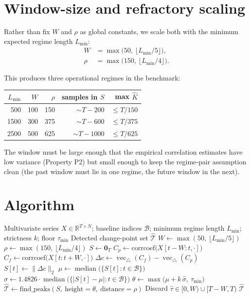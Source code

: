 \documentclass[11pt,a4paper]{article}
\newcommand{\med}{\operatorname{median}}
\newcommand{\vectri}{\operatorname{vec}_{\triangle}}
\newcommand{\R}{\mathbb{R}}
\begin{document}
\section{Window-size and refractory scaling}

Rather than fix $W$ and $\rho$ as global constants, we scale both with the
minimum expected regime length $L_{\min}$:
\begin{align}
W   &= \max\!\big(50,\ \lfloor L_{\min}/5 \rfloor\big), \\
\rho &= \max\!\big(150,\ \lfloor L_{\min}/4 \rfloor\big).
\end{align}

This produces three operational regimes in the benchmark:
\begin{center}
\begin{tabular}{rrrrr}
\toprule
$L_{\min}$ & $W$ & $\rho$ & samples in $S$ & max $\hat K$ \\
\midrule
500   & 100 & 150  & $\sim T - 200$  & $\le T / 150$ \\
1500  & 300 & 375  & $\sim T - 600$  & $\le T / 375$ \\
2500  & 500 & 625  & $\sim T - 1000$ & $\le T / 625$ \\
\bottomrule
\end{tabular}
\end{center}

The window must be large enough that the empirical correlation estimates
have low variance (Property P2) but small enough to keep the regime-pair
assumption clean (the past window must lie in one regime, the future
window in the next).

\section{Algorithm}

\begin{algorithm}[H]
\caption{v1-H: correlation-based change-point detection}
\label{alg:v1h}
\begin{algorithmic}[1]
\Require Multivariate series $X \in \R^{T \times N}$; baseline indices
         $\mathcal{B}$; minimum regime length $L_{\min}$; strictness $k$;
         floor $\tau_{\min}$
\Ensure  Detected change-point set $\widehat{\mathcal{T}}$
\Statex
\State $W \gets \max(50,\ \lfloor L_{\min}/5 \rfloor)$
\State $\rho \gets \max(150,\ \lfloor L_{\min}/4 \rfloor)$
\State $S \gets \mathbf{0}_T$
   \State $C_p \gets \mathrm{corrcoef}\big(X[t-W:t,\cdot]\big)$
   \State $C_f \gets \mathrm{corrcoef}\big(X[t:t+W,\cdot]\big)$
   \State $\Delta c \gets \vectri(C_f) - \vectri(C_p)$ 
   \State $S[t] \gets \|\Delta c\|_2$
\EndFor
\Statex
\State $\mu \gets \med\!\big(\{S[t] : t \in \mathcal{B}\}\big)$
\State $\hat\sigma \gets 1.4826 \cdot \med\!\big(\{|S[t] - \mu| : t \in \mathcal{B}\}\big)$
\State $\theta \gets \max\!\big(\mu + k\,\hat\sigma,\ \tau_{\min}\big)$
\Statex
\State $\widehat{\mathcal{T}} \gets \mathrm{find\_peaks}(S,\ \text{height} = \theta,\ \text{distance} = \rho)$
\State Discard $\hat\tau \in [0, W) \cup [T - W, T)$
\State \Return $\widehat{\mathcal{T}}$
\end{algorithmic}
\end{algorithm}
\end{document}
